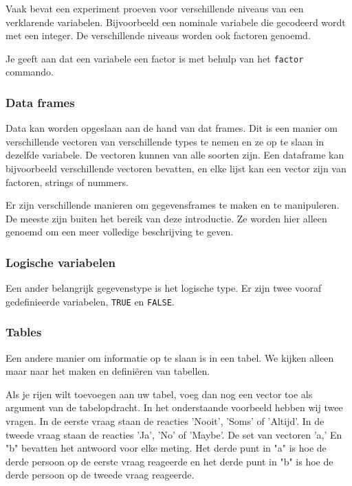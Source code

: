 Vaak bevat een experiment proeven voor verschillende niveaus van een  verklarende variabelen. Bijvoorbeeld een nominale variabele die gecodeerd wordt met een integer. De verschillende niveaus worden ook factoren genoemd.

Je geeft aan dat een variabele een factor is met behulp van het \texttt{factor} commando. 

\subsubsection{Data frames}

Data kan worden opgeslaan aan de hand van dat frames. Dit is een manier om verschillende vectoren van verschillende types te nemen en ze op te slaan in dezelfde variabele. De vectoren kunnen van alle soorten zijn. Een dataframe kan bijvoorbeeld verschillende vectoren bevatten, en elke lijst kan een vector zijn van factoren, strings of nummers.

Er zijn verschillende manieren om gegevensframes te maken en te manipuleren. De meeste zijn buiten het bereik van deze introductie. Ze worden hier alleen genoemd om een meer volledige beschrijving te geven. 



\subsubsection{Logische variabelen}

Een ander belangrijk gegevenstype is het logische type. Er zijn twee vooraf gedefinieerde variabelen, \texttt{TRUE} en \texttt{FALSE}.

\subsubsection{Tables}

Een andere  manier om informatie op te slaan is in een tabel.  We kijken alleen maar naar het maken en defini\"eren van tabellen. 


Als je rijen wilt toevoegen aan uw tabel, voeg dan nog een vector toe als argument van de tabelopdracht. In het onderstaande voorbeeld hebben wij twee vragen. In de eerste vraag staan de reacties  'Nooit', 'Soms' of 'Altijd'. In de tweede vraag staan de reacties 'Ja', 'No' of 'Maybe'. De set van vectoren 'a,' En "b" bevatten het antwoord voor elke meting. Het derde punt in "a" is hoe de derde persoon op de eerste vraag reageerde en het derde punt in "b" is hoe de derde persoon op de tweede vraag reageerde.

